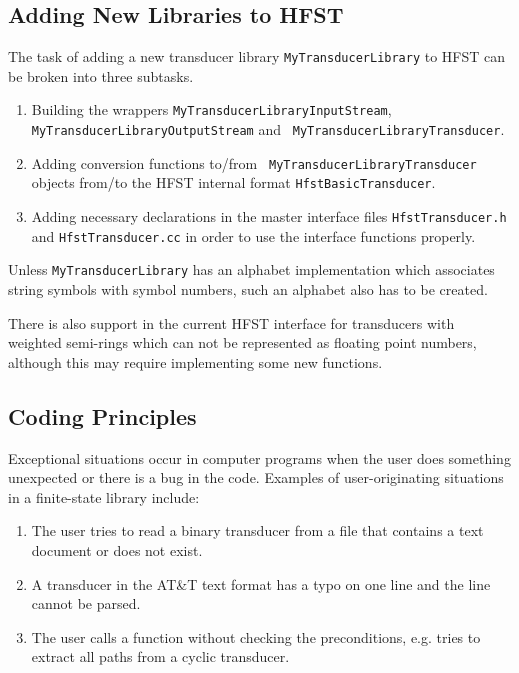 \documentclass{llncs}
\begin{document}
\subsection{Adding New Libraries to HFST}

The task of adding a new transducer library {\tt MyTransducerLibrary} to 
HFST can be broken into three subtasks.

\begin{enumerate}
\item Building the wrappers {\tt MyTransducerLibraryInputStream}, {\tt
  MyTransducer\-LibraryOutputStream} and {\tt
  MyTransducerLibraryTransducer}.
\item Adding conversion functions to/from {\tt
  MyTransducerLibraryTransducer} objects from/to the HFST internal
  format {\tt HfstBasicTransducer}.
\item Adding necessary declarations in the master interface files
  {\tt HfstTransdu\-cer.h} and {\tt HfstTransducer.cc} in order to use
  the interface functions properly.
\end{enumerate} 

Unless {\tt MyTransducerLibrary} has an alphabet implementation which
associates string symbols with symbol numbers, such an alphabet also has to
be created.

There is also support in the current HFST interface for transducers
with weighted semi-rings which can not be represented as floating point
numbers, although this may require implementing some new functions.

\subsection{Coding Principles}

Exceptional situations occur in computer programs when the
user does something unexpected or there is a bug in the code.
Examples of user-originating situations in a finite-state library include:

\begin{enumerate} 
\item The user tries to read a binary transducer from a
file that contains a text document or does not exist.
\item A transducer in the AT\&T text format has a typo on one line and the 
line cannot be parsed. 
\item The user calls a function without checking the preconditions,
e.g. tries to extract all paths from a cyclic transducer.
\end{enumerate}
\end{document}
